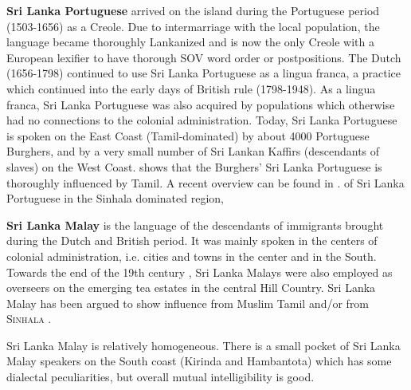 \documentclass{article}
\begin{document}
\textbf{Sri Lanka Portuguese} arrived on the island during the Portuguese period (1503-1656) as a Creole. Due to intermarriage with the local population, the language became thoroughly Lankanized and is now the only Creole with a European lexifier to have thorough SOV word order or postpositions. The Dutch (1656-1798) continued to use Sri Lanka Portuguese as a lingua franca, a practice which continued into the early days of British rule (1798-1948). As a lingua franca, Sri Lanka Portuguese was also acquired by populations which otherwise had no connections to the colonial administration. Today, Sri Lanka Portuguese is spoken on the East Coast (Tamil-dominated) by about 4000 Portuguese Burghers, and by a very small number of Sri Lankan Kaffirs (descendants of slaves) on the West Coast. \citet{Smith1979} shows that the Burghers' Sri Lanka Portuguese is thoroughly influenced by Tamil. A recent overview can be found in \citet{Nordhoff2013slp}.  %
of Sri Lanka Portuguese in the Sinhala dominated region, 


\textbf{Sri Lanka Malay} is the language of the descendants of immigrants brought during the Dutch and British period. It was mainly spoken in the centers of colonial administration, i.e. cities and towns in the center and in the South. Towards the end of the 19th century \citep{Hussainmiya1990}, Sri Lanka Malays were also employed as overseers on the emerging tea estates in the central Hill Country. Sri Lanka Malay has been argued to show influence from Muslim Tamil \citep{SmithEtAl2006cll} and/or from \textsc{Sinhala} \citep{Ansaldo2008genesis}. 

Sri Lanka Malay is relatively homogeneous. There is a small pocket of Sri Lanka Malay speakers on the South coast (Kirinda and Hambantota) which has some dialectal peculiarities, but overall mutual intelligibility is good. 

\end{document}

